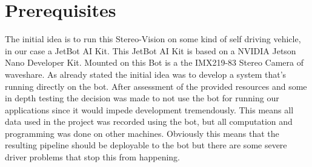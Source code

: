 \documentclass[journal,onecolumn]{IEEEtran}
\begin{document}
\section{Prerequisites}
\noindent The initial idea is to run this Stereo-Vision on some kind of self driving vehicle, in our case a JetBot AI Kit\cite{jetbot_wiki}. This JetBot AI Kit is based on a NVIDIA Jetson Nano Developer Kit\cite{nvidia_jetson}. Mounted on this Bot is a the IMX219-83 Stereo Camera\cite{cam_wiki} of waveshare. As already stated the initial idea was to develop a system that's running directly on the bot. After assessment of the provided resources and some in depth testing the decision was made to not use the bot for running our applications since it would impede development tremendously. This means all data used in the project was recorded using the bot, but all computation and programming was done on other machines. Obviously this means that the resulting pipeline should be deployable to the bot but there are some severe driver problems that stop this from happening.
\end{document}
